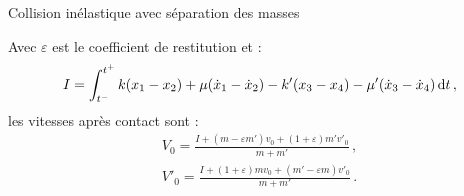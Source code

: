 \begin{frame}{Collision inélastique avec séparation des masses}
{{            \pause
            Avec $\varepsilon$ est le coefficient de restitution et :
            \scriptsize
            $$
            I = \int_{t^{-}}^{t^{+}} k(x_1 - x_2) + \mu (\dot x_1 - \dot x_2) - k'(x_3 - x_4) - \mu'(\dot x_3 - \dot x_4) \mathop{}\!\mathrm{d} t \,,
            $$
            \normalsize
            les vitesses après contact sont :
            \begingroup
            \color{red}
            \begin{align*}
                V_0 = \frac{I + (m-\varepsilon m')v_0 + (1+\varepsilon)m'v'_0}{m+m'}\,, \\
                V'_0 = \frac{I + (1+\varepsilon)mv_0 + (m'-\varepsilon m)v'_0}{m+m'}\,.
            \end{align*}
            \endgroup
            

        }

    }
    
\end{frame}





